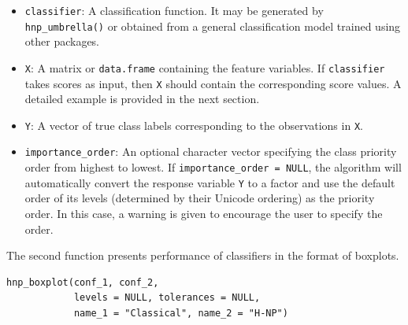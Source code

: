 \begin{itemize}
\item \texttt{classifier}: A classification function. It may be generated by \texttt{hnp\_umbrella()} or obtained from a general classification model trained using other packages.

\item \texttt{X}: A matrix or \texttt{data.frame} containing the feature variables. If \texttt{classifier} takes scores as input, then \texttt{X} should contain the corresponding score values. A detailed example is provided in the next section.

\item \texttt{Y}: A vector of true class labels corresponding to the observations in \texttt{X}.


\item \texttt{importance\_order}: An optional character vector specifying the class priority order from highest to lowest. If \texttt{importance\_order = NULL}, the algorithm will automatically convert the response variable \texttt{Y} to a factor and use the default order of its levels (determined by their Unicode ordering) as the priority order. In this case, a warning is given to encourage the user to specify the order.










\end{itemize}
 

\medskip

\noindent
The second function presents performance of classifiers in the format of boxplots.

\begin{verbatim}
hnp_boxplot(conf_1, conf_2, 
            levels = NULL, tolerances = NULL, 
            name_1 = "Classical", name_2 = "H-NP")
\end{verbatim}

